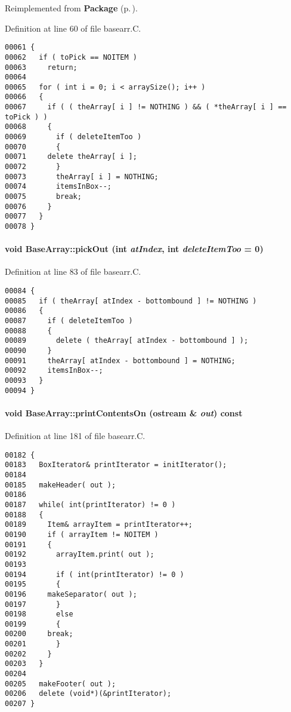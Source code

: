 Reimplemented from {\bf Package} {\rm (p.\,\pageref{Package_a3})}.

Definition at line 60 of file basearr.C.\small\begin{verbatim}00061 {
00062   if ( toPick == NOITEM )
00063     return;
00064   
00065   for ( int i = 0; i < arraySize(); i++ )
00066   {
00067     if ( ( theArray[ i ] != NOTHING ) && ( *theArray[ i ] == toPick ) )
00068     {
00069       if ( deleteItemToo )
00070       {
00071     delete theArray[ i ];
00072       }
00073       theArray[ i ] = NOTHING;
00074       itemsInBox--;
00075       break;
00076     }
00077   } 
00078 }
\end{verbatim}\normalsize 
\label{BaseArray_a8}
\paragraph{\setlength{\rightskip}{0pt plus 5cm}void Base\-Array::pick\-Out (int {\em at\-Index}, int {\em delete\-Item\-Too} = 0)}\hfill



Definition at line 83 of file basearr.C.\small\begin{verbatim}00084 {
00085   if ( theArray[ atIndex - bottombound ] != NOTHING )
00086   {
00087     if ( deleteItemToo )
00088     {
00089       delete ( theArray[ atIndex - bottombound ] );
00090     }
00091     theArray[ atIndex - bottombound ] = NOTHING;
00092     itemsInBox--;
00093   } 
00094 }
\end{verbatim}\normalsize 
\label{BaseArray_a13}
\paragraph{\setlength{\rightskip}{0pt plus 5cm}void Base\-Array::print\-Contents\-On (ostream \& {\em out}) const\hspace{0.3cm}{\tt  [virtual]}}\hfill



Definition at line 181 of file basearr.C.\small\begin{verbatim}00182 {
00183   BoxIterator& printIterator = initIterator();
00184   
00185   makeHeader( out );
00186   
00187   while( int(printIterator) != 0 )
00188   {
00189     Item& arrayItem = printIterator++;
00190     if ( arrayItem != NOITEM )
00191     {
00192       arrayItem.print( out );
00193       
00194       if ( int(printIterator) != 0 )
00195       {
00196     makeSeparator( out );
00197       }
00198       else 
00199       {
00200     break;
00201       }
00202     } 
00203   } 
00204   
00205   makeFooter( out );
00206   delete (void*)(&printIterator);
00207 }
\end{verbatim}\normalsize 
\label{BaseArray_b1}
